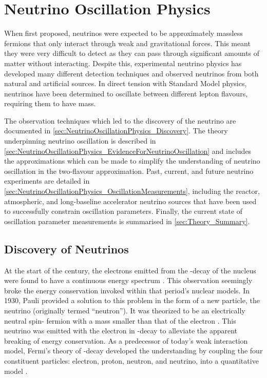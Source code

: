 \chapter{Neutrino Oscillation Physics}
\label{chap:NeutrinoOscillationPhysics}

When first proposed, neutrinos were expected to be approximately massless fermions that only interact through weak and gravitational forces. This meant they were very difficult to detect as they can pass through significant amounts of matter without interacting. Despite this, experimental neutrino physics has developed many different detection techniques and observed neutrinos from both natural and artificial sources. In direct tension with Standard Model physics, neutrinos have been determined to oscillate between different lepton flavours, requiring them to have mass. 

The observation techniques which led to the discovery of the neutrino are documented in \autoref{sec:NeutrinoOscillationPhysics_Discovery}. The theory underpinning neutrino oscillation is described in \autoref{sec:NeutrinoOscillationPhysics_EvidenceForNeutrinoOscillation} and includes the approximations which can be made to simplify the understanding of neutrino oscillation in the two-flavour approximation. Past, current, and future neutrino experiments are detailed in \autoref{sec:NeutrinoOscillationPhysics_OscillationMeasurements}, including the reactor, atmospheric, and long-baseline accelerator neutrino sources that have been used to successfully constrain oscillation parameters. Finally, the current state of oscillation parameter measurements is summarised in \autoref{sec:Theory_Summary}.

\section{Discovery of Neutrinos}
\label{sec:NeutrinoOscillationPhysics_Discovery}

At the start of the  century, the electrons emitted from the \quickmath{\beta}-decay of the nucleus were found to have a continuous energy spectrum \cite{Chadwick:262756, Ellis1927-qf}. This observation seemingly broke the energy conservation invoked within that period's nuclear models. In 1930, Pauli provided a solution to this problem in the form of a new particle, the neutrino (originally termed ``neutron''). It was theorized to be an electrically neutral spin- fermion with a mass smaller than that of the electron \cite{Pauli:1930pc}. This neutrino was emitted with the electron in \quickmath{\beta}-decay to alleviate the apparent breaking of energy conservation. As a predecessor of today's weak interaction model, Fermi's theory of \quickmath{\beta}-decay developed the understanding by coupling the four constituent particles: electron, proton, neutron, and neutrino, into a quantitative model \cite{Fermi:1934hr}.

